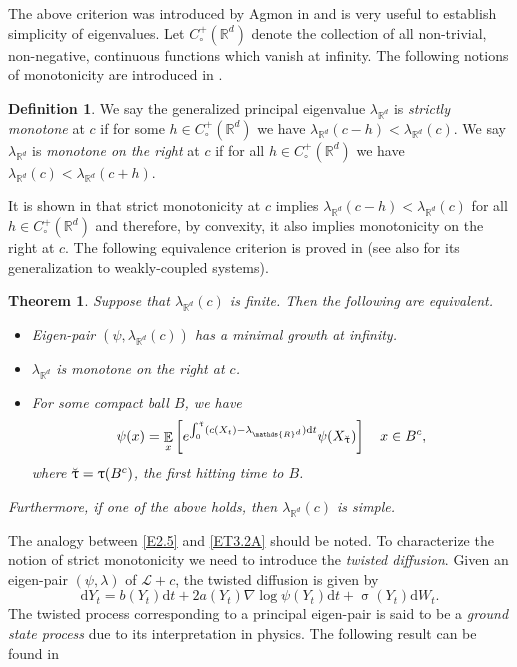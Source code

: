 \documentclass[notitlepage,11pt,reqno]{amsart}
\numberwithin{equation}{section}
\theoremstyle{plain}
\newtheorem{theorem}{Theorem}[section]
\theoremstyle{definition}
\newtheorem{definition}{Definition}[section]
\theoremstyle{remark}
\newcommand{\uuptau}{{\Breve{\uptau}}}
\newcommand{\sL}{{\mathscr{L}}}
\newcommand{\Rd}{{\mathds{R}^{d}}}
\DeclareMathOperator{\Exp}{\mathbb{E}} %
\newcommand{\D}{\mathrm{d}} %
\newcommand{\grad}{\nabla}
\begin{document}
The above criterion was introduced by Agmon in \cite{Agmon83} and is very useful to establish simplicity of eigenvalues. 
Let $C^+_\circ(\Rd)$ denote the collection of all non-trivial, non-negative, continuous functions which vanish at infinity. The following notions of monotonicity
are introduced in \cite{MR3926044}. 
\begin{definition}
We say the generalized principal eigenvalue $\lambda_\Rd$ is {\it strictly monotone} at $c$ if for some $h\in C^+_\circ(\Rd)$ we have
$\lambda_\Rd(c-h)<\lambda_\Rd(c)$. We say $\lambda_\Rd$ is {\it monotone on the right} at $c$ if for all $h\in C^+_\circ(\Rd)$ we have
$\lambda_\Rd(c)<\lambda_\Rd(c+h)$.
\end{definition}
It is shown in \cite{MR3926044} that strict monotonicity at $c$ implies $\lambda_\Rd(c-h)<\lambda_\Rd(c)$ for all $h\in C^+_\circ(\Rd)$ and therefore, by convexity, it also implies
monotonicity on the right at $c$. The following equivalence criterion is proved in \cite{MR3926044,MR3917226} (see also \cite{ABP2022} for its generalization to weakly-coupled systems).
\begin{theorem}\label{T3.2}
Suppose that $\lambda_\Rd(c)$ is finite. Then the following are equivalent.
\begin{itemize}
\item[(i)] Eigen-pair $(\psi, \lambda_\Rd(c))$ has a minimal growth at infinity.
\item[(ii)] $\lambda_\Rd$ is monotone on the right at $c$.
\item[(iii)] For some compact ball $B$, we have
\begin{equation}\label{ET3.2A}
\psi(x) = \Exp_x\left[e^{\int_0^{\uuptau}(c(X_t)-\lambda_\Rd)\D{t}}\psi(X_{\uuptau})\right] \quad x\in B^c,
\end{equation}
where $\uuptau=\uptau(B^c)$, the first hitting time to $B$.
\end{itemize}
Furthermore, if one of the above holds, then $\lambda_\Rd(c)$ is simple.
\end{theorem}
The analogy between \eqref{E2.5} and \eqref{ET3.2A} should be noted. To characterize the notion of strict monotonicity we need to introduce the {\it twisted diffusion}.
Given an eigen-pair $(\psi, \lambda)$ of $\sL+c$, the twisted diffusion is given by
$$\D{Y}_t = b(Y_t)\D{t} + 2a(Y_t) \grad\log\psi(Y_t) \D{t} + \upsigma(Y_t) \D{W}_t.$$
The twisted process corresponding to a principal eigen-pair is said to be a {\it ground state process} due to its interpretation in physics. The following result can be found in \cite[Theorem~2.1]{MR3926044} 
\end{document}
